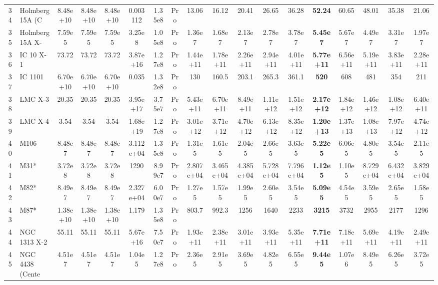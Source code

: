 \documentclass[11pt, a4paper]{article}
\begin{document}
\begin{landscape}
\begin{table}[htbp]
{\begin{tabular}{c l c c c c c c c c c c c c c c c c}
        34 & Holmberg 15A (C & 8.48e+10 & 8.48e+10 & 8.48e+10 & 0.003112 & 1.35e8 & Pro & 13.06 & 16.12 & 20.41 & 26.65 & 36.28 & \textbf{52.24} & 60.65 & 48.01 & 35.38 & 21.06 \\
        35 & Holmberg 15A X- & 7.59e5 & 7.59e5 & 7.59e5 & 3.25e8 & 1.05e8 & Pro & 1.36e7 & 1.68e7 & 2.13e7 & 2.78e7 & 3.78e7 & \textbf{5.45e7} & 5.67e7 & 4.49e7 & 3.31e7 & 1.97e7 \\
        36 & IC 10 X-1 & 73.72 & 73.72 & 73.72 & 3.87e+16 & 1.27e8 & Pro & 1.44e+11 & 1.78e+11 & 2.26e+11 & 2.94e+11 & 4.01e+11 & \textbf{5.77e+11} & 6.56e+11 & 5.19e+11 & 3.83e+11 & 2.28e+11 \\
        37 & IC 1101 & 6.70e+10 & 6.70e+10 & 6.70e+10 & 0.035 & 1.32e8 & Pro & 130 & 160.5 & 203.1 & 265.3 & 361.1 & \textbf{520} & 608 & 481 & 354 & 211 \\
        38 & LMC X-3 & 20.35 & 20.35 & 20.35 & 3.95e+17 & 3.75e7 & Pro & 5.43e+11 & 6.70e+11 & 8.49e+11 & 1.11e+12 & 1.51e+12 & \textbf{2.17e+12} & 1.84e+12 & 1.46e+12 & 1.08e+12 & 6.40e+11 \\
        39 & LMC X-4 & 3.54 & 3.54 & 3.54 & 1.68e+19 & 1.27e8 & Pro & 3.01e+12 & 3.71e+12 & 4.70e+12 & 6.13e+12 & 8.35e+12 & \textbf{1.20e+13} & 1.37e+13 & 1.08e+13 & 7.97e+12 & 4.74e+12 \\
        40 & M106 & 8.48e7 & 8.48e7 & 8.48e7 & 3.112e+04 & 1.35e8 & Pro & 1.31e5 & 1.61e5 & 2.04e5 & 2.66e5 & 3.63e5 & \textbf{5.22e5} & 6.06e5 & 4.80e5 & 3.54e5 & 2.11e5 \\
        41 & M31* & 3.72e8 & 3.72e8 & 3.72e8 & 1290 & 8.99e7 & Pro & 2.807e+04 & 3.465e+04 & 4.385e+04 & 5.728e+04 & 7.796e+04 & \textbf{1.12e5} & 1.10e5 & 8.729e+04 & 6.432e+04 & 3.829e+04 \\
        42 & M82* & 8.49e7 & 8.49e7 & 8.49e7 & 2.327e+04 & 6.00e7 & Pro & 1.27e5 & 1.57e5 & 1.99e5 & 2.60e5 & 3.54e5 & \textbf{5.09e5} & 4.54e5 & 3.59e5 & 2.65e5 & 1.58e5 \\
        43 & M87* & 1.38e+10 & 1.38e+10 & 1.38e+10 & 1.179 & 1.35e8 & Pro & 803.7 & 992.3 & 1256 & 1640 & 2233 & \textbf{3215} & 3732 & 2955 & 2177 & 1296 \\
        44 & NGC 1313 X-2 & 55.11 & 55.11 & 55.11 & 5.67e+16 & 7.50e7 & Pro & 1.93e+11 & 2.38e+11 & 3.01e+11 & 3.93e+11 & 5.35e+11 & \textbf{7.71e+11} & 7.18e+11 & 5.69e+11 & 4.19e+11 & 2.49e+11 \\
        45 & NGC 4438 (Cente & 4.51e7 & 4.51e7 & 4.51e7 & 1.04e5 & 1.27e8 & Pro & 2.36e5 & 2.91e5 & 3.69e5 & 4.82e5 & 6.55e5 & \textbf{9.44e5} & 1.07e6 & 8.49e5 & 6.26e5 & 3.72e5 \\

\end{tabular}}
\end{table}
\end{landscape}
\end{document}
